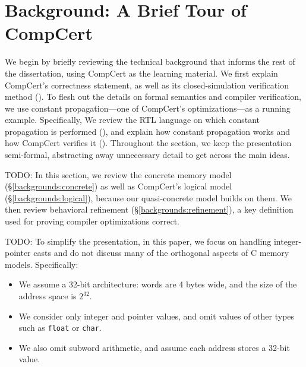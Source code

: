 \section{Background: A Brief Tour of CompCert}
\label{sec:background}

We begin by briefly reviewing the technical background that informs the rest of the dissertation,
using CompCert as the learning material.  We first explain CompCert's correctness statement, as well
as its closed-simulation verification method ().  To flesh out the
details on formal semantics and compiler verification, we use constant propagation---one of
CompCert's optimizations---as a running example.  Specifically, We review the RTL language on which
constant propagation is performed (), and explain how constant propagation
works and how CompCert verifies it ().  Throughout the section, we
keep the presentation semi-formal, abstracting away unnecessary detail to get across the main ideas.

TODO: In this section, we review the concrete memory model (\S\ref{backgrounds:concrete}) as well as
CompCert's logical model (\S\ref{backgrounds:logical}), because our quasi-concrete model builds on
them.  We then review behavioral refinement (\S\ref{backgrounds:refinement}), a key definition used
for proving compiler optimizations correct.

TODO: To simplify the presentation, in this paper, we focus on handling integer-pointer casts and do not
discuss many of the orthogonal aspects of C memory models. Specifically:

\begin{itemize}
\item We assume a 32-bit architecture: words are 4 bytes wide, and 
the size of the address space is $2^{32}$.
\item We consider only integer and pointer values, and omit values of
  other types such as \texttt{float} or \texttt{char}.
\item We also omit subword arithmetic, and assume each address 
  stores a 32-bit value. 
\end{itemize}


